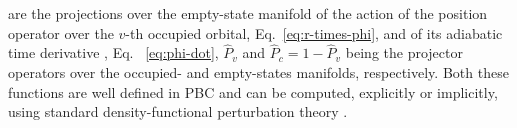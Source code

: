 are the projections over the empty-state manifold of the action of the position operator over the $v$-th occupied orbital, Eq.~\eqref{eq:r-times-phi}, and of its adiabatic time derivative \citep{Giannozzi2017}, Eq.~ \eqref{eq:phi-dot}, $\hat P_v$ and $\hat P_c = 1 - \hat P_v$ being the projector operators over the occupied- and empty-states manifolds, respectively. Both these functions are well defined in PBC and can be computed, explicitly or implicitly, using standard density-functional perturbation theory \citep{Baroni2001}.
